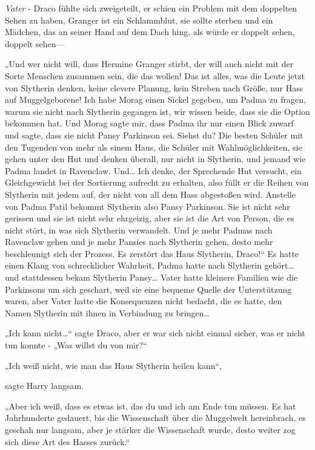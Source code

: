 {\emph{Vater} - Draco fühlte sich zweigeteilt, er schien ein Problem mit dem doppelten Sehen zu haben, Granger ist ein Schlammblut, sie sollte sterben und ein Mädchen, das an seiner Hand auf dem Dach hing, als würde er doppelt sehen, doppelt sehen—

„Und wer nicht will, dass Hermine Granger stirbt, der will auch nicht mit der Sorte Menschen zusammen sein, die das wollen! Das ist alles, was die Leute jetzt von Slytherin denken, keine clevere Planung, kein Streben nach Größe, nur Hass auf Muggelgeborene! Ich habe Morag einen Sickel gegeben, um Padma zu fragen, warum sie nicht nach Slytherin gegangen ist, wir wissen beide, dass sie die Option bekommen hat. Und Morag sagte mir, dass Padma ihr nur einen Blick zuwarf und sagte, dass sie nicht Pansy Parkinson sei. Siehst du? Die besten Schüler mit den Tugenden von mehr als einem Haus, die Schüler mit Wahlmöglichkeiten, sie gehen unter den Hut und denken überall, nur nicht in Slytherin, und jemand wie Padma landet in Ravenclaw. Und… Ich denke, der Sprechende Hut versucht, ein Gleichgewicht bei der Sortierung aufrecht zu erhalten, also füllt er die Reihen von Slytherin mit jedem auf, der nicht von all dem Hass abgestoßen wird. Anstelle von Padma Patil bekommt Slytherin also Pansy Parkinson. Sie ist nicht sehr gerissen und sie ist nicht sehr ehrgeizig, aber sie ist die Art von Person, die es nicht stört, in was sich Slytherin verwandelt. Und je mehr Padmas nach Ravenclaw gehen und je mehr Pansies nach Slytherin gehen, desto mehr beschleunigt sich der Prozess. Es zerstört das Haus Slytherin, Draco!“ Es hatte einen Klang von schrecklicher Wahrheit, Padma hatte nach Slytherin gehört… und stattdessen bekam Slytherin Pansy… Vater hatte kleinere Familien wie die Parkinsons um sich geschart, weil sie eine bequeme Quelle der Unterstützung waren, aber Vater hatte die Konsequenzen nicht bedacht, die es hatte, den Namen Slytherin mit ihnen in Verbindung zu bringen…

„Ich kann nicht…“ sagte Draco, aber er war sich nicht einmal sicher, was er nicht tun konnte - „Was willst du von mir?“

„Ich weiß nicht, wie man das Haus Slytherin heilen kann“,

sagte Harry langsam.

„Aber ich weiß, dass es etwas ist, das du und ich am Ende tun müssen. Es hat Jahrhunderte gedauert, bis die Wissenschaft über die Muggelwelt hereinbrach, es geschah nur langsam, aber je stärker die Wissenschaft wurde, desto weiter zog sich diese Art des Hasses zurück.“

}
